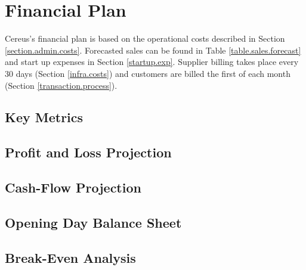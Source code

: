 {\let\cleardoublepage\relax \chapter{Financial Plan}}

Cereus's financial plan is based on the operational costs described in Section \ref{section.admin.costs}. Forecasted sales can be found in Table \ref{table.sales.forecast} and start up expenses in Section \ref{startup.exp}. Supplier billing takes place every 30 days (Section \ref{infra.costs}) and customers are billed the first of each month (Section \ref{transaction.process}).

\section{Key Metrics}



\section{Profit and Loss Projection}

\section{Cash-Flow Projection}

\section{Opening Day Balance Sheet}

\section{Break-Even Analysis}
